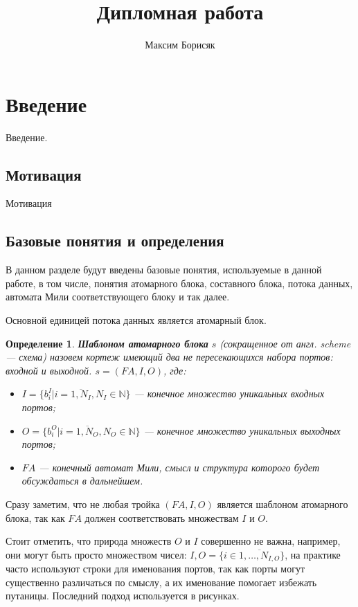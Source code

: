 \documentclass[10pt,a4paper]{article}
\author{Максим Борисяк}
\title{Дипломная работа}
\newtheorem{defen}{Определение}
\newcommand{\FA}{F\!A}
\begin{document}
\maketitle

\section{Введение}

Введение.

\subsection{Мотивация}
Мотивация

\subsection{Базовые понятия и определения}
В данном разделе будут введены базовые понятия, используемые в данной работе, в том числе,
понятия атомарного блока, составного блока, потока данных, автомата Мили соответствующего блоку и так далее.

Основной единицей потока данных является атомарный блок.
\begin{defen}
  \textbf{Шаблоном атомарного блока} $s$ (сокращенное от англ. \textit{scheme} --- схема) назовем кортеж имеющий два не пересекающихся набора портов: \textit{входной} и \textit{выходной}.
  $s = (\FA, I, O)$, где:
  \begin{itemize}
    \item $I = \{b^I_i \vert i = \overline{1, N_I}, N_I \in \mathbb{N}\}$ --- конечное множество уникальных входных портов;
    \item $O = \{b^O_i \vert i = \overline{1, N_O}, N_O \in \mathbb{N}\}$ --- конечное множество уникальных выходных портов;
    \item $\FA$ --- конечный автомат Мили, смысл и структура которого будет обсуждаться в дальнейшем.
  \end{itemize}
\end{defen}
Сразу заметим, что не любая тройка $(\FA, I, O)$ является шаблоном атомарного блока, так как $\FA$ должен
соответствовать множествам $I$ и $O$.

Стоит отметить, что природа множеств $O$ и $I$ совершенно не важна, например, они могут быть просто множеством чисел: $I, O = \{i \in \overline{1, \dots, N_{I, O}}\}$,
на практике часто используют строки для именования портов, так как порты могут существенно различаться по смыслу, а их именование помогает избежать путаницы.
Последний подход используется в рисунках.
\end{document}

